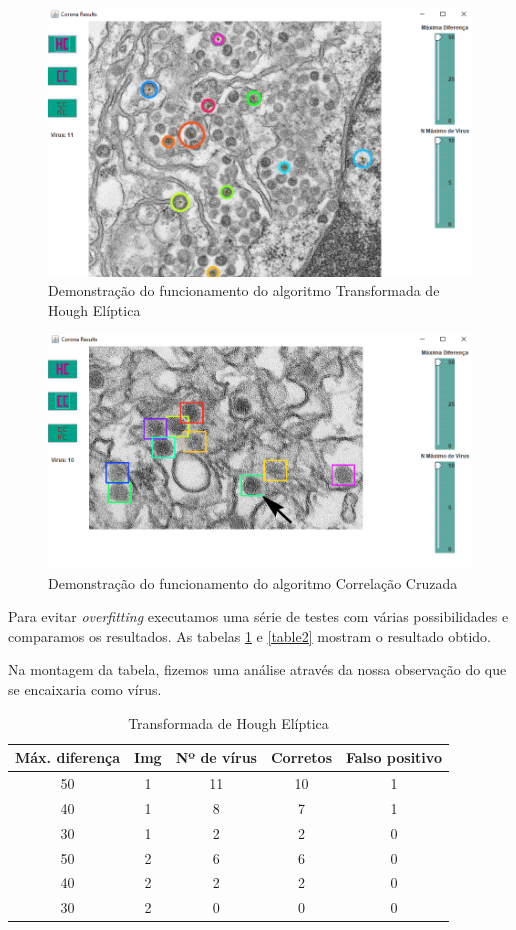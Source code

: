 \documentclass[conference, brazil]{IEEEtran}
\begin{document}
\begin{figure}[htpb]
\centering
\includegraphics[scale=0.4]{THE.png}
\caption{Demonstração do funcionamento do algoritmo Transformada de Hough Elíptica}
\label{fig1}
\end{figure}

\begin{figure}[htpb]
\centering
\includegraphics[scale=0.4]{CC.png}
\caption{Demonstração do funcionamento do algoritmo Correlação Cruzada}
\label{fig2}
\end{figure}

Para evitar \textit{overfitting} executamos uma série de testes com várias possibilidades e comparamos os resultados. As tabelas \ref{table1} e \ref{table2} mostram o resultado obtido. 

Na montagem da tabela, fizemos uma análise através da nossa observação do que se encaixaria como vírus.

\begin{table}[htpb]
\centering
\caption{Transformada de Hough Elíptica}
\begin{tabular}
{|c|c|c|c|c|}
\hline
Máx. diferença & Img & Nº de vírus & Corretos & Falso positivo\\
\hline
50 & 1 & 11 & 10 & 1\\
\hline
40 & 1 & 8 & 7 & 1\\
\hline
30 & 1 & 2 & 2 & 0\\
\hline
50 & 2 & 6 & 6 & 0\\
\hline
40 & 2 & 2 & 2 & 0\\
\hline
30 & 2 & 0 & 0 & 0\\
\hline
\end{tabular}
\label{table1}
\end{table}
\end{document}
